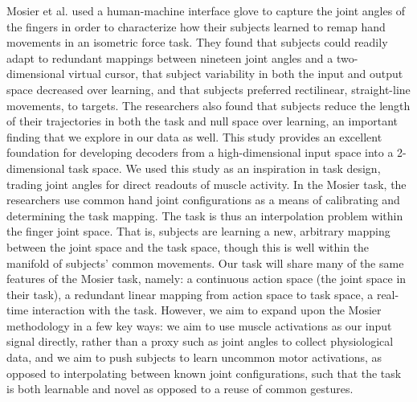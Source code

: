 \documentclass[../main.tex]{subfiles}
\begin{document}
Mosier et al.\cite{MosierRemappingHandMovements2005} used a human-machine interface glove to capture the joint angles of the fingers in order to characterize how their subjects learned to remap hand movements in an isometric force task. They found that subjects could readily adapt to redundant mappings between nineteen joint angles and a two-dimensional virtual cursor, that subject variability in both the input and output space decreased over learning, and that subjects preferred rectilinear, straight-line movements, to targets. The researchers also found that subjects reduce the length of their trajectories in both the task and null space over learning, an important finding that we explore in our data as well. This study provides an excellent foundation for developing decoders from a high-dimensional input space into a 2-dimensional task space. We used this study as an inspiration in task design, trading joint angles for direct readouts of muscle activity. In the Mosier task, the researchers use common hand joint configurations as a means of calibrating and determining the task mapping. The task is thus an interpolation problem within the finger joint space. That is, subjects are learning a new, arbitrary mapping between the joint space and the task space, though this is well within the manifold of subjects' common movements. Our task will share many of the same features of the Mosier task, namely: a continuous action space (the joint space in their task), a redundant linear mapping from action space to task space, a real-time interaction with the task. However, we aim to expand upon the Mosier methodology in a few key ways: we aim to use muscle activations as our input signal directly, rather than a proxy such as joint angles to collect physiological data, and we aim to push subjects to learn uncommon motor activations, as opposed to interpolating between known joint configurations, such that the task is both learnable and novel as opposed to a reuse of common gestures.
\end{document}
